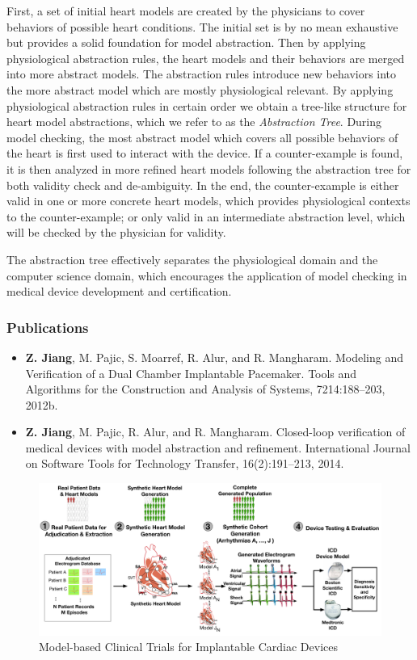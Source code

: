 \documentclass[a4paper]{article}
\begin{document}
First, a set of initial heart models are created by the physicians to cover behaviors of possible heart conditions.
The initial set is by no mean exhaustive but provides a solid foundation for model abstraction.
Then by applying physiological abstraction rules, the heart models and their behaviors are merged into more abstract models.
The abstraction rules introduce new behaviors into the more abstract model which are mostly physiological relevant.
By applying physiological abstraction rules in certain order we obtain a tree-like structure for heart model abstractions, which we refer to as the \emph{Abstraction Tree}.
During model checking, the most abstract model which covers all possible behaviors of the heart is first used to interact with the device.
If a counter-example is found, it is then analyzed in more refined heart models following the abstraction tree for both validity check and de-ambiguity.
In the end, the counter-example is either valid in one or more concrete heart models, which provides physiological contexts to the counter-example; or only valid in an intermediate abstraction level, which will be checked by the physician for validity.

The abstraction tree effectively separates the physiological domain and the computer science domain, which encourages the application of model checking in medical device development and certification.
\subsubsection{Publications}
\begin{itemize}
\item \textbf{Z. Jiang}, M. Pajic, S. Moarref, R. Alur, and R. Mangharam. Modeling and Verification
of a Dual Chamber Implantable Pacemaker. Tools and Algorithms for the
Construction and Analysis of Systems, 7214:188–203, 2012b.
\item \textbf{Z. Jiang}, M. Pajic, R. Alur, and R. Mangharam. Closed-loop verification of medical
devices with model abstraction and refinement. International Journal on Software
Tools for Technology Transfer, 16(2):191–213, 2014.
\end{itemize}

\newpage
\begin{figure}[t]
	\centering
	\includegraphics[scale=0.25]{figs/figMBCToverview.pdf}
	\caption{\small Model-based Clinical Trials for Implantable Cardiac Devices}
	\label{fig:mbct}
\end{figure}
\end{document}

